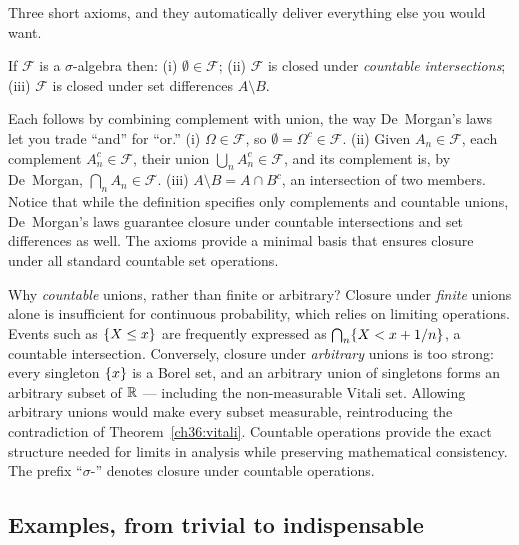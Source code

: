 Three short axioms, and they automatically deliver everything else you would want.

\begin{proposition}
\label{ch36:closure}
If $\mathcal{F}$ is a $\sigma$-algebra then:
(i) $\emptyset \in \mathcal{F}$;
(ii) $\mathcal{F}$ is closed under \emph{countable intersections};
(iii) $\mathcal{F}$ is closed under set differences $A \setminus B$.
\end{proposition}

\begin{whybox}
Each follows by combining complement with union, the way De~Morgan's laws let you
trade ``and'' for ``or.''
(i) $\Omega \in \mathcal{F}$, so $\emptyset = \Omega^c \in \mathcal{F}$.
(ii) Given $A_n \in \mathcal{F}$, each complement $A_n^c \in \mathcal{F}$, their
union $\bigcup_n A_n^c \in \mathcal{F}$, and its complement is, by De~Morgan,
$\bigcap_n A_n \in \mathcal{F}$.
(iii) $A \setminus B = A \cap B^c$, an intersection of two members.
Notice that while the definition specifies only complements and countable
unions, De~Morgan's laws guarantee closure under countable intersections and set
differences as well. The axioms provide a minimal basis that ensures closure
under all standard countable set operations.
\end{whybox}

\begin{focusbox}
Why \emph{countable} unions, rather than finite or arbitrary?
Closure under \emph{finite} unions alone is insufficient for continuous probability,
which relies on limiting operations. Events such as $\{X \le x\}$ are frequently
expressed as $\bigcap_n \{X < x + 1/n\}$, a countable intersection. Conversely,
closure under \emph{arbitrary} unions is too strong: every singleton $\{x\}$ is a Borel
set, and an arbitrary union of singletons forms an arbitrary subset of $\mathbb{R}$ --- including
the non-measurable Vitali set. Allowing arbitrary unions would make every subset measurable,
reintroducing the contradiction of Theorem~\ref{ch36:vitali}. Countable operations provide
the exact structure needed for limits in analysis while preserving mathematical consistency.
The prefix ``$\sigma$-'' denotes closure under countable operations.
\end{focusbox}

\subsection{Examples, from trivial to indispensable}


